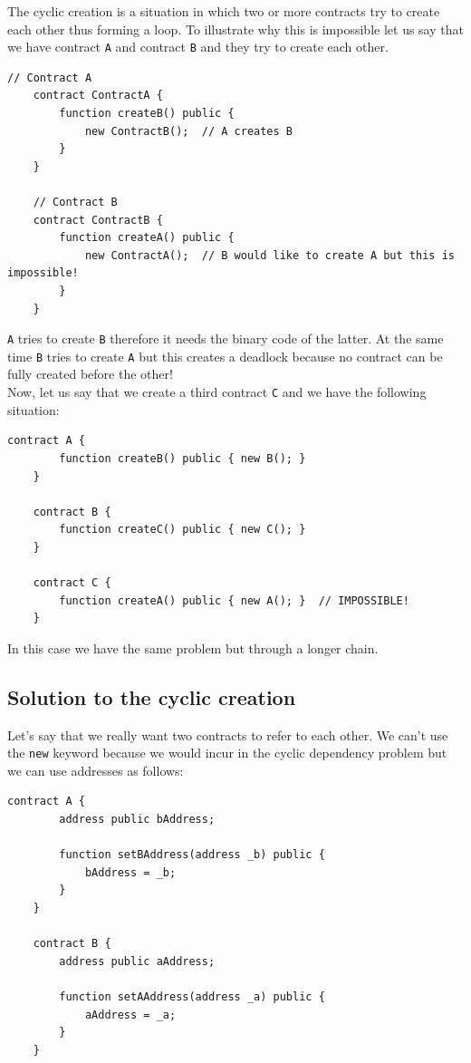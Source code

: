 \documentclass{scrbook}
\begin{document}
The cyclic creation is a situation in which two or more contracts try to create each other thus forming a loop. To illustrate why this is impossible let us say that we have contract \texttt{A} and contract \texttt{B} and they try to create each other.

\begin{lstlisting}[caption={Example of direct loop: A $\to$ B $\to$ A}]
    // Contract A
    contract ContractA {
        function createB() public {
            new ContractB();  // A creates B
        }
    }
    
    // Contract B
    contract ContractB {
        function createA() public {
            new ContractA();  // B would like to create A but this is impossible!
        }
    }
\end{lstlisting}

\texttt{A} tries to create \texttt{B} therefore it needs the binary code of the latter. At the same time \texttt{B} tries to create \texttt{A} but this creates a deadlock because no contract can be fully created before the other! \\

Now, let us say that we create a third contract \texttt{C} and we have the following situation:

\begin{lstlisting}[caption={Example of indirect loop: A $\to$ B $\to$ C $\to$ A}]
    contract A {
        function createB() public { new B(); }
    }
    
    contract B {
        function createC() public { new C(); }
    }
    
    contract C {
        function createA() public { new A(); }  // IMPOSSIBLE!
    }
\end{lstlisting}

In this case we have the same problem but through a longer chain.

\subsection{Solution to the cyclic creation}

Let's say that we really want two contracts to refer to each other. We can't use the \texttt{new} keyword because we would incur in the cyclic dependency problem but we can use addresses as follows:

\begin{lstlisting}[caption={Solution to the cyclic dependency problem}]
    contract A {
        address public bAddress;
        
        function setBAddress(address _b) public {
            bAddress = _b;
        }
    }
    
    contract B {
        address public aAddress;
        
        function setAAddress(address _a) public {
            aAddress = _a;
        }
    }
\end{lstlisting}
\end{document}
